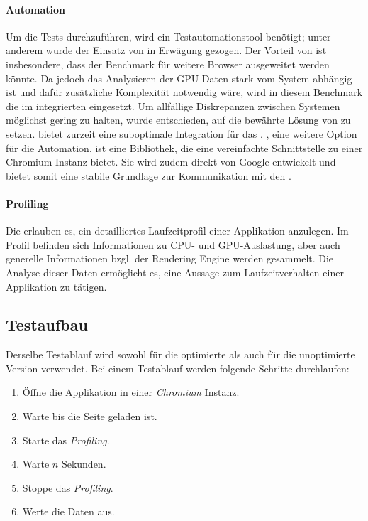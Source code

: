 \paragraph{Automation}
Um die Tests durchzuführen, wird ein Testautomationstool benötigt; unter anderem wurde der Einsatz von  in Erwägung gezogen.
Der Vorteil von  ist insbesondere, dass der Benchmark für weitere Browser ausgeweitet werden könnte.
Da jedoch das Analysieren der \gls{GPU} Daten stark vom System abhängig ist und dafür zusätzliche Komplexität notwendig wäre, wird in diesem Benchmark die im  integrierten  eingesetzt. Um allfällige Diskrepanzen zwischen Systemen möglichst gering zu halten, wurde entschieden, auf die bewährte Lösung von  zu setzen.
 bietet zurzeit eine suboptimale Integration für das . , eine weitere Option für die Automation, ist eine Bibliothek, die eine vereinfachte Schnittstelle zu einer \gls{Chromium} Instanz bietet.
Sie wird zudem direkt von Google entwickelt und bietet somit eine stabile Grundlage zur Kommunikation mit den .

\paragraph{Profiling}
Die  erlauben es, ein detailliertes Laufzeitprofil einer Applikation anzulegen.
Im Profil befinden sich Informationen zu \gls{CPU}- und \gls{GPU}-Auslastung, aber auch generelle Informationen bzgl. der \gls{Rendering Engine} werden gesammelt.
Die Analyse dieser Daten ermöglicht es, eine Aussage zum Laufzeitverhalten einer Applikation zu tätigen.

\subsection{Testaufbau}
Derselbe Testablauf wird sowohl für die optimierte als auch für die unoptimierte Version verwendet.
Bei einem Testablauf werden folgende Schritte durchlaufen:

\begin{enumerate}
  \item Öffne die Applikation in einer \emph{Chromium} Instanz.
  \item Warte bis die Seite geladen ist.
  \item Starte das \emph{Profiling}.
  \item Warte $n$ Sekunden.
  \item Stoppe das \emph{Profiling}.
  \item Werte die Daten aus.
\end{enumerate}

